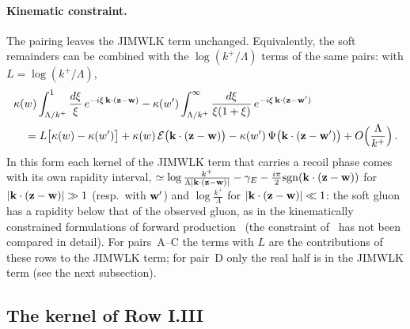 \paragraph{Kinematic constraint.} The pairing leaves the JIMWLK term unchanged. Equivalently, the soft remainders can be combined with the $\log(k^+/\Lambda)$ terms of the same pairs: with $L=\log(k^+/\Lambda)$,
\begin{align}\label{eq:kinconstr}
&\kappa(w)\int_{\Lambda/k^+}^{1}\frac{d\xi}{\xi}\,e^{-i\xi\,\mathbf{k}\cdot(\mathbf{z}-\mathbf{w})}-\kappa(w')\int_{\Lambda/k^+}^\infty\frac{d\xi}{\xi(1+\xi)}\,e^{-i\xi\,\mathbf{k}\cdot(\mathbf{z}-\mathbf{w}')}\notag\\
&\quad=L\big[\kappa(w)-\kappa(w')\big]+\kappa(w)\,\mathcal E\big(\mathbf{k}\cdot(\mathbf{z}-\mathbf{w})\big)-\kappa(w')\,\Psi\big(\mathbf{k}\cdot(\mathbf{z}-\mathbf{w}')\big)+O\Big(\frac{\Lambda}{k^+}\Big)\,.
\end{align}
In this form each kernel of the JIMWLK term that carries a recoil phase comes with its own rapidity interval, $\simeq\log\frac{k^+}{\Lambda|\mathbf{k}\cdot(\mathbf{z}-\mathbf{w})|}-\gamma_E-\frac{i\pi}{2}{\rm sgn}(\mathbf{k}\cdot(\mathbf{z}-\mathbf{w}))$ for $|\mathbf{k}\cdot(\mathbf{z}-\mathbf{w})|\gg1$ (resp.\ with $\mathbf{w}'$) and $\log\frac{k^+}{\Lambda}$ for $|\mathbf{k}\cdot(\mathbf{z}-\mathbf{w})|\ll1$: the soft gluon has a rapidity below that of the observed gluon, as in the kinematically constrained formulations of forward production~\cite{Altinoluk:2014eka,Ducloue:2016shw} (the constraint of~\cite{Ducloue:2016shw} has not been compared in detail). For pairs~A--C the terms with $L$ are the contributions of these rows to the JIMWLK term; for pair~D only the real half is in the JIMWLK term (see the next subsection).

\subsection{The kernel of Row I.III}\label{sec:fin_GIIII}

